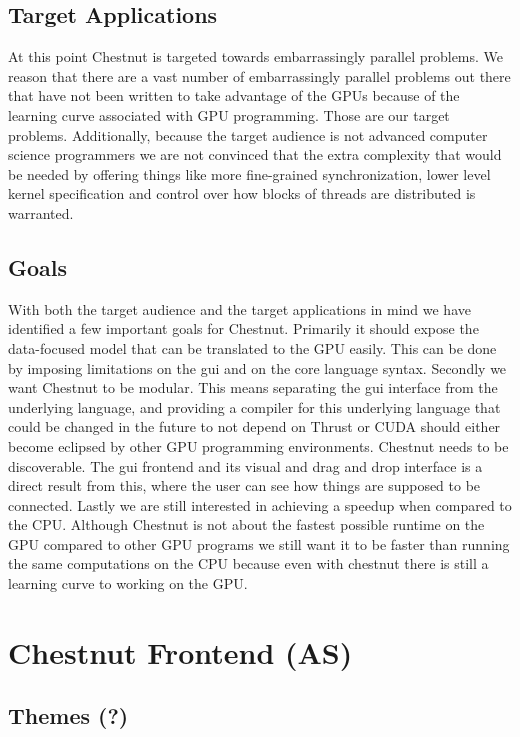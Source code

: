 \documentclass[twocolumn]{article}
\renewcommand{\|}{\origbar} %
\begin{document}
\subsection{Target Applications}

At this point Chestnut is targeted towards embarrassingly parallel problems. We reason that there are a vast number of embarrassingly parallel problems out there that have not been written to take advantage of the GPUs because of the learning curve associated with GPU programming. Those are our target problems. Additionally, because the target audience is not advanced computer science programmers we are not convinced that the extra complexity that would be needed by offering things like more fine-grained synchronization, lower level kernel specification and control over how blocks of threads are distributed is warranted.

\subsection{Goals}

With both the target audience and the target applications in mind we have identified a few important goals for Chestnut. Primarily it should expose the data-focused model that can be translated to the GPU easily. This can be done by imposing limitations on the gui and on the core language syntax. Secondly we want Chestnut to be modular. This means separating the gui interface from the underlying language, and providing a compiler for this underlying language that could be changed in the future to not depend on Thrust or CUDA should either become eclipsed by other GPU programming environments. Chestnut needs to be discoverable. The gui frontend and its visual and drag and drop interface is a direct result from this, where the user can see how things are supposed to be connected. Lastly we are still interested in achieving a speedup when compared to the CPU. Although Chestnut is not about the fastest possible runtime on the GPU compared to other GPU programs we still want it to be faster than running the same computations on the CPU because even with chestnut there is still a learning curve to working on the GPU.

\section{Chestnut Frontend (AS)}

\subsection{Themes (?)}
\end{document}
